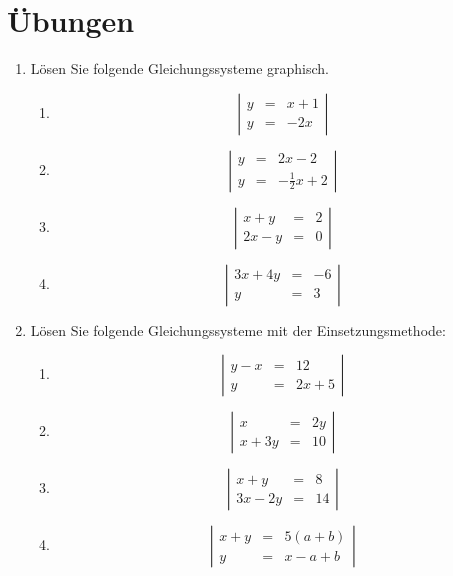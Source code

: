 \documentclass[%
11pt,%
twoside,%
titlepage,%
german,%
]{scrartcl}
\newenvironment{system}{\begin{displaymath}
  \left| 
    \begin{array}{rcl}}{\end{array} \right| 
\end{displaymath}}
\begin{document}
\section*{Übungen}

\begin{enumerate}

\item \label{aufg:linglsyst:graphisch} L\"osen Sie folgende Gleichungssysteme graphisch.
  \begin{enumerate}
  \item 
    \begin{system}
      y & = & x+1 \\
      y & = & -2x
    \end{system}
  \item 
    \begin{system}
      y & = & 2x-2 \\
      y & = & -\frac{1}{2}x+2
    \end{system}
  \item 
    \begin{system}
      x+y & = & 2 \\
      2x-y & = & 0
    \end{system}
  \item 
    \begin{system}
      3x+4y & = & -6 \\
      y & = & 3
    \end{system}
  \end{enumerate}

\item \label{aufg:linglsyst:einsetzung} L\"osen Sie folgende Gleichungssysteme mit der Einsetzungsmethode:
  \begin{enumerate}
  \item 
    \begin{system}
      y-x & = & 12 \\
      y & = & 2x+5
    \end{system}
  \item 
    \begin{system}
      x & = & 2y \\
      x+3y & = & 10
    \end{system}
  \item 
    \begin{system}
      x+y & = & 8 \\
      3x-2y & = & 14
    \end{system}
  \item 
    \begin{system}
      x+y & = & 5(a+b) \\
      y & = & x-a+b
    \end{system}
  \end{enumerate}


\end{enumerate}
\end{document}
